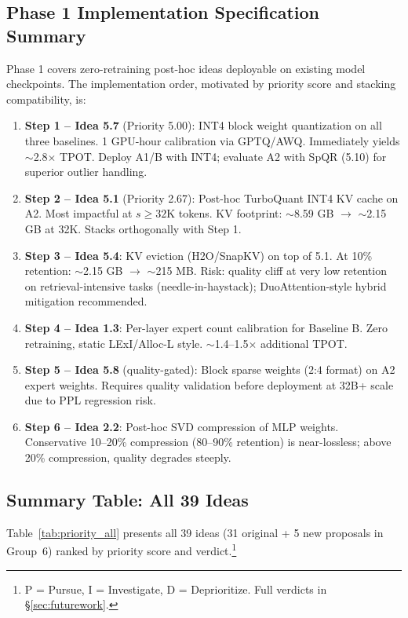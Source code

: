 \documentclass[11pt]{article}
\begin{document}
\subsection{Phase 1 Implementation Specification Summary}

Phase 1 covers zero-retraining post-hoc ideas deployable on existing model checkpoints. The implementation order, motivated by priority score and stacking compatibility, is:

\begin{enumerate}
    \item \textbf{Step 1 -- Idea 5.7} (Priority 5.00): INT4 block weight quantization on all three baselines. 1 GPU-hour calibration via GPTQ/AWQ. Immediately yields $\sim$2.8$\times$ TPOT. Deploy A1/B with INT4; evaluate A2 with SpQR (5.10) for superior outlier handling.
    \item \textbf{Step 2 -- Idea 5.1} (Priority 2.67): Post-hoc TurboQuant INT4 KV cache on A2. Most impactful at $s \geq 32$K tokens. KV footprint: $\sim$8.59 GB $\to$ $\sim$2.15 GB at 32K. Stacks orthogonally with Step 1.
    \item \textbf{Step 3 -- Idea 5.4}: KV eviction (H2O/SnapKV) on top of 5.1. At 10\% retention: $\sim$2.15 GB $\to$ $\sim$215 MB. Risk: quality cliff at very low retention on retrieval-intensive tasks (needle-in-haystack); DuoAttention-style hybrid mitigation recommended.
    \item \textbf{Step 4 -- Idea 1.3}: Per-layer expert count calibration for Baseline B. Zero retraining, static LExI/Alloc-L style. $\sim$1.4--1.5$\times$ additional TPOT.
    \item \textbf{Step 5 -- Idea 5.8} (quality-gated): Block sparse weights ($2$:$4$ format) on A2 expert weights. Requires quality validation before deployment at 32B+ scale due to PPL regression risk.
    \item \textbf{Step 6 -- Idea 2.2}: Post-hoc SVD compression of MLP weights. Conservative 10--20\% compression (80--90\% retention) is near-lossless; above 20\% compression, quality degrades steeply.
\end{enumerate}

\subsection{Summary Table: All 39 Ideas}

Table~\ref{tab:priority_all} presents all 39 ideas (31 original + 5 new proposals in Group~6) ranked by priority score and verdict.\footnote{P = Pursue, I = Investigate, D = Deprioritize. Full verdicts in \S\ref{sec:futurework}.}
\end{document}
